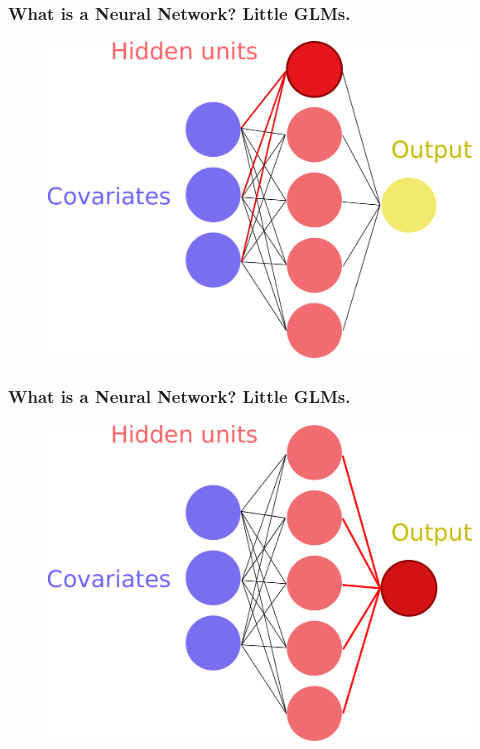 \documentclass[handout, aspectratio = 169]{beamer}
\begin{document}
\begin{frame}
\frametitle{What is a Neural Network? Little GLMs.}

\vspace{6mm}
\begin{figure}
    \includegraphics[height = 0.7\textheight]{neural_network2.pdf}
\end{figure} 
\end{frame} 


\begin{frame}
\frametitle{What is a Neural Network? Little GLMs.}

\vspace{6mm}
\begin{figure}
    \includegraphics[height = 0.7\textheight]{neural_network3.pdf}
\end{figure} 
\end{frame} 
\end{document}
